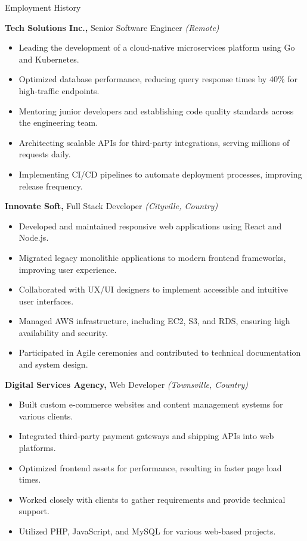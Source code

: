 \begin{rubric}{Employment History}

\entry*[2022 -- present]%
\textbf{Tech Solutions Inc.,} Senior Software Engineer \emph{(Remote)}
\begin{itemize}
    \item Leading the development of a cloud-native microservices platform using Go and Kubernetes.
    \item Optimized database performance, reducing query response times by 40\% for high-traffic endpoints.
    \item Mentoring junior developers and establishing code quality standards across the engineering team.
    \item Architecting scalable APIs for third-party integrations, serving millions of requests daily.
    \item Implementing CI/CD pipelines to automate deployment processes, improving release frequency.
\end{itemize}
\medskip

\entry*[2019 -- 2022]%
\textbf{Innovate Soft,} Full Stack Developer \emph{(Cityville, Country)}
\begin{itemize}
    \item Developed and maintained responsive web applications using React and Node.js.
    \item Migrated legacy monolithic applications to modern frontend frameworks, improving user experience.
    \item Collaborated with UX/UI designers to implement accessible and intuitive user interfaces.
    \item Managed AWS infrastructure, including EC2, S3, and RDS, ensuring high availability and security.
    \item Participated in Agile ceremonies and contributed to technical documentation and system design.
\end{itemize}
\medskip

\entry*[2016 -- 2019]%
\textbf{Digital Services Agency,} Web Developer \emph{(Townsville, Country)}
\begin{itemize}
    \item Built custom e-commerce websites and content management systems for various clients.
    \item Integrated third-party payment gateways and shipping APIs into web platforms.
    \item Optimized frontend assets for performance, resulting in faster page load times.
    \item Worked closely with clients to gather requirements and provide technical support.
    \item Utilized PHP, JavaScript, and MySQL for various web-based projects.
\end{itemize}
\medskip

\end{rubric}